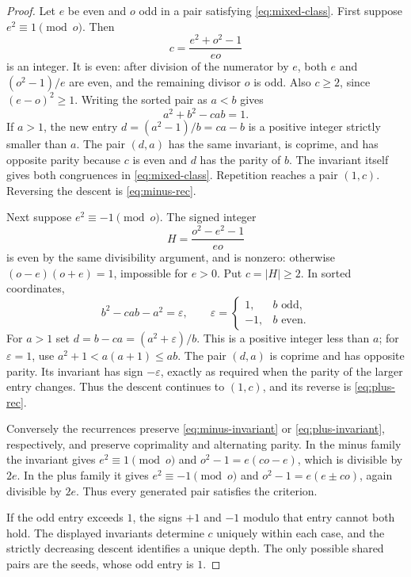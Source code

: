 \begin{proof}
Let $e$ be even and $o$ odd in a pair satisfying
\eqref{eq:mixed-class}. First suppose $e^2\equiv1\pmod o$.
Then
\[
 c=\frac{e^2+o^2-1}{eo}
\]
is an integer. It is even: after division of the numerator by $e$, both
$e$ and $(o^2-1)/e$ are even, and the remaining divisor $o$ is odd.
Also $c\ge2$, since $(e-o)^2\ge1$. Writing the sorted pair as $a<b$
gives
\begin{equation}\label{eq:minus-invariant}
 a^2+b^2-cab=1.
\end{equation}
If $a>1$, the new entry
$d=(a^2-1)/b=ca-b$ is a positive integer strictly smaller than $a$.
The pair $(d,a)$ has the same invariant, is coprime, and has opposite
parity because $c$ is even and $d$ has the parity of $b$. The invariant
itself gives both congruences in \eqref{eq:mixed-class}. Repetition
reaches a pair $(1,c)$. Reversing the descent is
\eqref{eq:minus-rec}.

Next suppose $e^2\equiv-1\pmod o$. The signed integer
\[
 H=\frac{o^2-e^2-1}{eo}
\]
is even by the same divisibility argument, and is nonzero: otherwise
$(o-e)(o+e)=1$, impossible for $e>0$. Put $c=|H|\ge2$. In sorted
coordinates,
\begin{equation}\label{eq:plus-invariant}
 b^2-cab-a^2=\varepsilon,
 \qquad \varepsilon=\begin{cases}1,&b\text{ odd},\\-1,&b\text{ even}.
 \end{cases}
\end{equation}
For $a>1$ set
$d=b-ca=(a^2+\varepsilon)/b$. This is a positive integer less than
$a$; for $\varepsilon=1$, use $a^2+1<a(a+1)\le ab$. The pair
$(d,a)$ is coprime and has opposite parity. Its invariant has sign
$-\varepsilon$, exactly as required when the parity of the larger entry
changes. Thus the descent continues to $(1,c)$, and its reverse is
\eqref{eq:plus-rec}.

Conversely the recurrences preserve \eqref{eq:minus-invariant} or
\eqref{eq:plus-invariant}, respectively, and preserve coprimality and
alternating parity. In the minus family the invariant gives
$e^2\equiv1\pmod o$ and
$o^2-1=e(co-e)$, which is divisible by $2e$. In the plus family it
gives $e^2\equiv-1\pmod o$ and
$o^2-1=e(e\pm co)$, again divisible by $2e$. Thus every generated
pair satisfies the criterion.

If the odd entry exceeds $1$, the signs $+1$ and $-1$ modulo that
entry cannot both hold. The displayed invariants determine $c$
uniquely within each case, and the strictly decreasing descent
identifies a unique depth. The only possible shared pairs are the seeds,
whose odd entry is $1$.
\end{proof}

